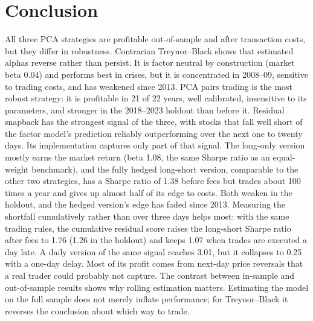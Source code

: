 \documentclass[12pt,letterpaper]{article}
\begin{document}
\section{Conclusion}

All three PCA strategies are profitable out-of-sample and after transaction costs, but they differ in robustness. Contrarian Treynor--Black shows that estimated alphas reverse rather than persist. It is factor neutral by construction (market beta 0.04) and performs best in crises, but it is concentrated in 2008--09, sensitive to trading costs, and has weakened since 2013. PCA pairs trading is the most robust strategy: it is profitable in 21 of 22 years, well calibrated, insensitive to its parameters, and stronger in the 2018--2023 holdout than before it. Residual snapback has the strongest signal of the three, with stocks that fall well short of the factor model's prediction reliably outperforming over the next one to twenty days. Its implementation captures only part of that signal. The long-only version mostly earns the market return (beta 1.08, the same Sharpe ratio as an equal-weight benchmark), and the fully hedged long-short version, comparable to the other two strategies, has a Sharpe ratio of 1.38 before fees but trades about 100 times a year and gives up almost half of its edge to costs. Both weaken in the holdout, and the hedged version's edge has faded since 2013. Measuring the shortfall cumulatively rather than over three days helps most: with the same trading rules, the cumulative residual score raises the long-short Sharpe ratio after fees to 1.76 (1.26 in the holdout) and keeps 1.07 when trades are executed a day late. A daily version of the same signal reaches 3.01, but it collapses to 0.25 with a one-day delay. Most of its profit comes from next-day price reversals that a real trader could probably not capture. The contrast between in-sample and out-of-sample results shows why rolling estimation matters. Estimating the model on the full sample does not merely inflate performance; for Treynor--Black it reverses the conclusion about which way to trade.
\end{document}
